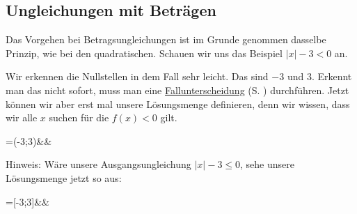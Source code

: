 \documentclass[12pt]{article}
\newcommand{\highlight}[2]{\textcolor{blue}{\hyperref[#1]{#2}} (S. \pageref{#1})}
\begin{document}
	\subsection{Ungleichungen mit Beträgen}
		Das Vorgehen bei Betragsungleichungen ist im Grunde genommen dasselbe Prinzip, wie bei den quadratischen. Schauen wir uns das Beispiel $\vert x \vert -3 < 0$ an. 
		\begin{center}
		\end{center}
		Wir erkennen die Nullstellen in dem Fall sehr leicht. Das sind $-3$ und $3$. Erkennt man das nicht sofort, muss man eine \highlight{subsec:betragsfunktionen}{Fallunterscheidung} durchführen. Jetzt können wir aber erst mal unsere Lösungsmenge definieren, denn wir wissen, dass wir alle $x$ suchen für die $f(x)<0$ gilt.
		\begin{flalign*}
		=(-3;3)&&
		\end{flalign*}
		Hinweis: Wäre unsere Ausgangsungleichung $\vert x \vert -3 \le 0$, sehe unsere Lösungsmenge jetzt so aus:
		\begin{flalign*}
		=[-3;3]&&
		\end{flalign*}
\end{document}
